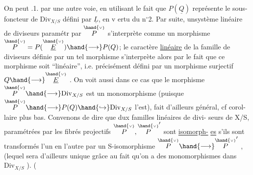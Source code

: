 On peut  .1. par une autre voie, en utilisant le fait
que $P(\underline{Q})$ représente le  sous-foncteur de $\mathrm{Div}_{X/S}$ défini par
$\underline{L}$, en v ertu du n$^{\circ}$2. Par suite, unsystème linéaire de diviseurs paramétr
par $\overset{\hand{\scriptscriptstyle\vee}}{P}$  s'interprète comme un morphisme $\overset{\hand{\scriptscriptstyle\vee}}{P} = P(\overset{\hand{\scriptscriptstyle\vee}}{\underline{E}})\hand{\longrightarrow} P(Q)$; le caractère
\uline{linéaire} de la famille de diviseurs définie par un tel morphisme
s'interprète alors par le fait que ce morphisme soit ``linéaire'', i.e.
précisément défini par un morphisme surjectif $Q\hand{\longrightarrow}\overset{\hand{\scriptscriptstyle\vee}}{\underline{E}}$ . \margin{$\ulcorner$} On voit aussi
dans ce cas que le morphisme $\overset{\hand{\scriptscriptstyle\vee}}{P}\hand{\longrightarrow}\mathrm{Div}_{X/S}$ est un monomorphisme 
(puisque $\overset{\hand{\scriptscriptstyle\vee}}{P}\hand{\longrightarrow} P(Q)\hand{\hookrightarrow}\mathrm{Div}_{X/S}$ l'est), fait d'ailleurs  général, cf corol-%
laire plus bas. Convenons  de dire que dux familles linéaires de divi-%
seurs de X/S, paramétrées par les fibrés projectifs $\overset{\hand{\scriptscriptstyle\vee}}{P},\overset{\hand{\scriptscriptstyle\vee}}{P}'$ sont \uline{isomorph-}%
\uline{es} s'ils sont transformés l'un en l'autre par un S-isomorphisme $\overset{\hand{\scriptscriptstyle\vee}}{P}\hand{\longrightarrow}\overset{\hand{\scriptscriptstyle\vee}}{P}'$ ,
(lequel sera d'ailleurs unique grâce au fait qu'on a des monomorphismes
dans $\mathrm{Div}_{X/S}$ ). 
(

